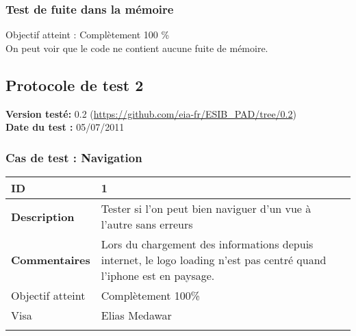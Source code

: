 		 \subsubsection*{Test de fuite dans la mémoire}
		 Objectif atteint : {\color{green}Complètement 100 \% \CheckedBox}\\
		 On peut voir que le code ne contient aucune fuite de mémoire.
		 
		 
		\subsection{Protocole de test 2}
		 		\textbf{Version testé:} 0.2 (\url{https://github.com/eia-fr/ESIB_PAD/tree/0.2}) \\
		 		\textbf{	Date du test :} 05/07/2011
		 
		 		\subsubsection*{Cas de test : Navigation}
		 				 \begin{longtable}{m{4cm}|p{10cm}|}
		 				 \textbf{ ID} & 1 \\
		 				 \hline \textbf{Description} & Tester si l'on peut bien naviguer d'un vue à l'autre sans erreurs\\
		 				 \hline \textbf{Commentaires} &Lors du chargement des informations depuis internet, le logo loading n'est pas centré quand l'iphone est en paysage. \\
		 				 \hline Objectif  atteint & {\color{green} Complètement 100\% \CheckedBox } \\
		 				\hline Visa & Elias Medawar \\	
		 				 \\
		 			 \end{longtable} 
